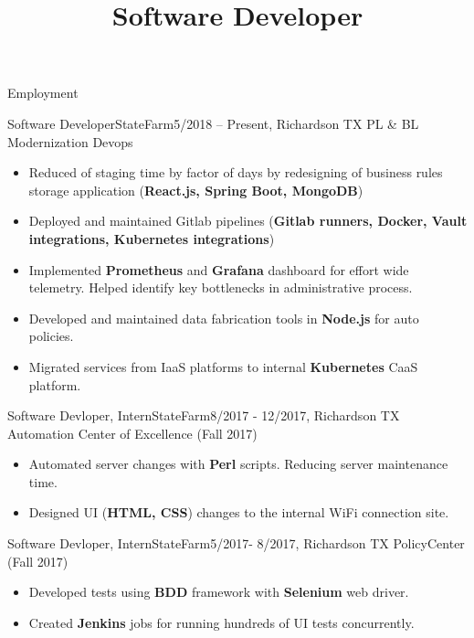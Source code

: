 \documentclass[]{lau}
\title{Software Developer}
\begin{document}
	\makeheader

	\begin{cvsection}{Employment}
		\begin{cvsubsection}{Software Developer}{StateFarm}{5/2018 – Present, Richardson TX}
			PL \& BL Modernization Devops
			\begin{itemize}
				\item Reduced of staging time by factor of days by redesigning of business rules storage application (\textbf{React.js, Spring Boot, MongoDB})
				\item Deployed and maintained Gitlab pipelines (\textbf{Gitlab runners, Docker, Vault integrations, Kubernetes integrations})
				\item Implemented \textbf{Prometheus} and \textbf{Grafana} dashboard for effort wide telemetry. Helped identify key bottlenecks in administrative process.
				\item Developed and maintained data fabrication tools in \textbf{Node.js} for auto policies.
				\item Migrated services from IaaS platforms to internal \textbf{Kubernetes} CaaS platform.
			\end{itemize}
		\end{cvsubsection}

		\begin{cvsubsection}{Software Devloper, Intern}{StateFarm}{8/2017 - 12/2017, Richardson TX}
			Automation Center of Excellence (Fall 2017)
			\begin{itemize}
				\item Automated server changes with \textbf{Perl} scripts. Reducing server maintenance time.
				\item Designed UI (\textbf{HTML, CSS}) changes to the internal WiFi connection site.
			\end{itemize}
		\end{cvsubsection}

		\begin{cvsubsection}{Software Devloper, Intern}{StateFarm}{5/2017- 8/2017, Richardson TX}
			PolicyCenter (Fall 2017)
			\begin{itemize}
				\item Developed tests using \textbf{BDD} framework with \textbf{Selenium} web driver.
				\item Created \textbf{Jenkins} jobs for running hundreds of UI tests concurrently.
			\end{itemize}
		\end{cvsubsection}
	\end{cvsection}
\end{document}
